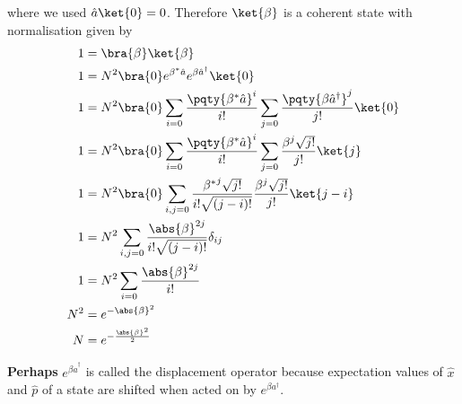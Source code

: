 \documentclass[12pt]{article}
\begin{document}
        where we used \(\hat{a} \ket{0} = 0\). Therefore \(\ket{\beta} \) is a coherent state with normalisation given by \begin{align*}
            1 &= \bra{\beta} \ket{\beta} \\
            1 &= N^2 \bra{0} e^{\beta^* \hat{a}} e^{\beta \hat{a}^\dagger } \ket{0} \\
            1 &= N^2 \bra{0} \sum_{i = 0} \frac{\pqty{\beta^* \hat{a}}^i}{i!} \sum_{j = 0} \frac{\pqty{\beta \hat{a}^\dagger }^j}{j!} \ket{0} \\
            1 &= N^2 \bra{0} \sum_{i = 0} \frac{\pqty{\beta^* \hat{a}}^i}{i!} \sum_{j = 0} \frac{\beta^j \sqrt{j!}}{j!} \ket{j} \\
            1 &= N^2 \bra{0} \sum_{i,j = 0} \frac{{\beta^*}^j \sqrt{j!} }{i!\sqrt{(j - i)!}}  \frac{\beta^j \sqrt{j!}}{j!} \ket{j - i} \\
            1 &= N^2 \sum_{i,j = 0} \frac{\abs{\beta}^{2j} }{i!\sqrt{(j - i)!}} \delta_{ij} \\
            1 &= N^2 \sum_{i = 0} \frac{\abs{\beta}^{2j}}{i!}  \\
            N^2 &=e^{ - \abs{\beta}^2}\\
            N &=e^{ - \frac{\abs{\beta}^2}{2}}
        \end{align*}

        \textbf{Perhaps} \(e^{\beta \hat{a}^\dagger }\) is called the displacement operator because expectation values of \(\hat{x}\) and \(\hat{p}\) of a state are shifted when acted on by \(e^{\beta a^\dagger }\).
\end{document}
